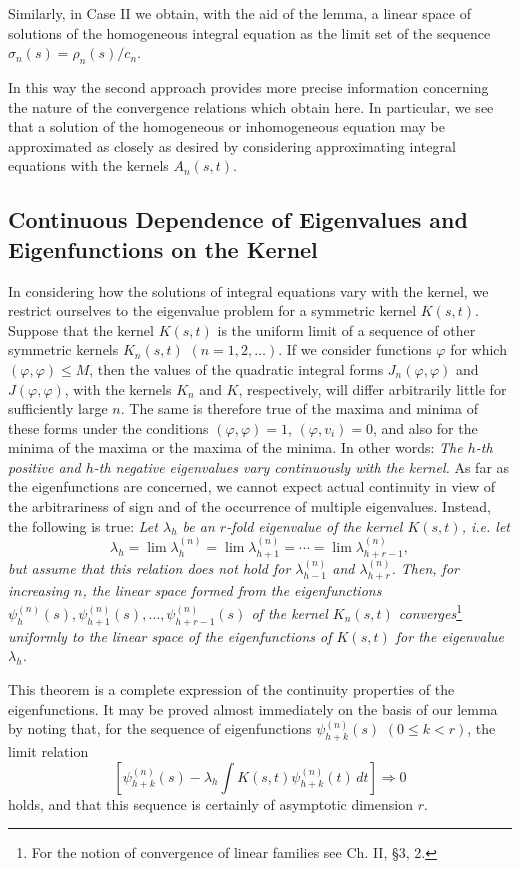 Similarly, in Case II we obtain, with the aid of the lemma, a linear space of solutions of the homogeneous integral equation as the limit set of the sequence $\sigma_n(s)=\rho_n(s)/c_n$.

In this way the second approach provides more precise information concerning the nature of the convergence relations which obtain here. In particular, we see that a solution of the homogeneous or inhomogeneous equation may be approximated as closely as desired by considering approximating integral equations with the kernels $A_n(s,t)$.

\subsection{Continuous Dependence of Eigenvalues and Eigenfunctions on the Kernel}
In considering how the solutions of integral equations vary with the kernel, we restrict ourselves to the eigenvalue problem for a symmetric kernel $K(s,t)$. Suppose that the kernel $K(s,t)$ is the uniform limit of a sequence of other symmetric kernels $K_n(s,t)$ $(n=1,2,\ldots)$. If we consider functions $\varphi$ for which $(\varphi,\varphi)\le M$, then the values of the quadratic integral forms $J_n(\varphi,\varphi)$ and $J(\varphi,\varphi)$, with the kernels $K_n$ and $K$, respectively, will differ arbitrarily little for sufficiently large $n$. The same is therefore true of the maxima and minima of these forms under the conditions $(\varphi,\varphi)=1$, $(\varphi,v_i)=0$, and also for the minima of the maxima or the maxima of the minima. In other words: \emph{The $h$-th positive and $h$-th negative eigenvalues vary continuously with the kernel.} As far as the eigenfunctions are concerned, we cannot expect actual continuity in view of the arbitrariness of sign and of the occurrence of multiple eigenvalues. Instead, the following is true: \emph{Let $\lambda_h$ be an $r$-fold eigenvalue of the kernel $K(s,t)$, i.e. let}
\[
\lambda_h=\lim\lambda_h^{(n)}=\lim\lambda_{h+1}^{(n)}=\cdots=\lim\lambda_{h+r-1}^{(n)},
\]
\emph{but assume that this relation does not hold for $\lambda_{h-1}^{(n)}$ and $\lambda_{h+r}^{(n)}$. Then, for increasing $n$, the linear space formed from the eigenfunctions $\psi_h^{(n)}(s),\psi_{h+1}^{(n)}(s),\ldots,\psi_{h+r-1}^{(n)}(s)$ of the kernel $K_n(s,t)$ converges}\footnote{For the notion of convergence of linear families see Ch. II, \S3, 2.} \emph{uniformly to the linear space of the eigenfunctions of $K(s,t)$ for the eigenvalue $\lambda_h$.}

This theorem is a complete expression of the continuity properties of the eigenfunctions. It may be proved almost immediately on the basis of our lemma by noting that, for the sequence of eigenfunctions $\psi_{h+k}^{(n)}(s)$ $(0\le k<r)$, the limit relation
\[
\left[\psi_{h+k}^{(n)}(s)-\lambda_h\int K(s,t)\psi_{h+k}^{(n)}(t)\,dt\right]\Rightarrow0
\]
holds, and that this sequence is certainly of asymptotic dimension $r$.

